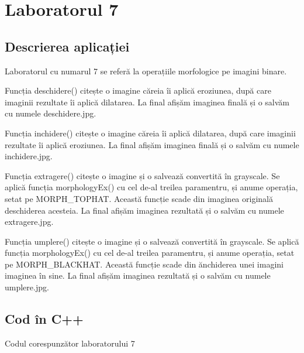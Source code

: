 \documentclass{amsart}
\begin{document}
\newpage

\section{Laboratorul 7}

\subsection{Descrierea aplicației}
\par
Laboratorul cu numarul 7 se referă la operațiile morfologice pe imagini binare.
\\ \par
Funcția deschidere() citește o imagine căreia îi aplică eroziunea, după care imaginii rezultate îi aplică dilatarea. La final afișăm imaginea finală și o salvăm cu numele deschidere.jpg.
\\ \par
Funcția inchidere() citește o imagine căreia îi aplică dilatarea, după care imaginii rezultate îi aplică eroziunea. La final afișăm imaginea finală și o salvăm cu numele inchidere.jpg.
\\ \par
Funcția extragere() citește o imagine și o salvează convertită în grayscale. Se aplică funcția morphologyEx() cu cel de-al treilea paramentru, și anume operația, setat pe MORPH\_TOPHAT. Această funcție scade din imaginea originală deschiderea acesteia. La final afișăm imaginea rezultată și o salvăm cu numele extragere.jpg.
\\ \par
Funcția umplere() citește o imagine și o salvează convertită în grayscale. Se aplică funcția morphologyEx() cu cel de-al treilea paramentru, și anume operația, setat pe MORPH\_BLACKHAT. Această funcție scade din ănchiderea unei imagini imaginea în sine. La final afișăm imaginea rezultată și o salvăm cu numele umplere.jpg.
\\ \par

\subsection{Cod \^{i}n C++}

Codul corespunzător laboratorului 7
\end{document}
